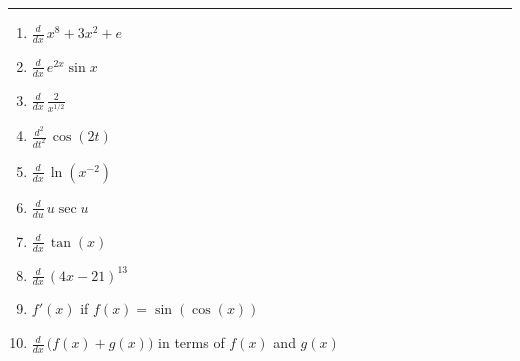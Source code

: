 \documentclass[12pt]{article}
\begin{document}
\hrule
\vfill
\begin{enumerate}
	\item $\displaystyle \frac{d}{dx}\, x^8 + 3x^2 + e$ \hfill \underline{\hspace{2 in}} \hspace{.5 in} \, 
	\vfill
	\item $\displaystyle \frac{d}{dx}\, e^{2x}\sin x$ \hfill \underline{\hspace{2 in}} \hspace{.5 in} \, 
	\vfill
	\item $\displaystyle \frac{d}{dx}\, \frac{2}{x^{1/2}}$ \hfill \underline{\hspace{2 in}} \hspace{.5 in} \, 
	\vfill
	\item $\displaystyle \frac{d^2}{dt^2}\, \cos(2t)$ \hfill \underline{\hspace{2 in}} \hspace{.5 in} \, 
	\vfill
	\item $\displaystyle \frac{d}{dx}\, \ln(x^{-2})$ \hfill \underline{\hspace{2 in}} \hspace{.5 in} \, 
	\vfill
	\item $\displaystyle \frac{d}{du}\, u \sec u$ \hfill \underline{\hspace{2 in}} \hspace{.5 in} \, 
	\vfill
	\item $\displaystyle \frac{d}{dx}\,\tan(x)$ \hfill \underline{\hspace{2 in}} \hspace{.5 in} \, 
	\vfill
	\item $\displaystyle \frac{d}{dx}\, (4x - 21)^{13}$ \hfill \underline{\hspace{2 in}} \hspace{.5 in} \, 
	\vfill
	\item $f'(x)$ if $f(x) = \sin(\cos(x))$ \hfill \underline{\hspace{2 in}} \hspace{.5 in} \, 
	\vfill
	\item $\displaystyle \frac{d}{dx}\, \bigg(f(x) + g(x)\bigg)$ in terms of $f(x)$ and $g(x)$ \hfill \underline{\hspace{2 in}} \hspace{.5 in} \, 
	\vfill
\end{enumerate}
\end{document}
